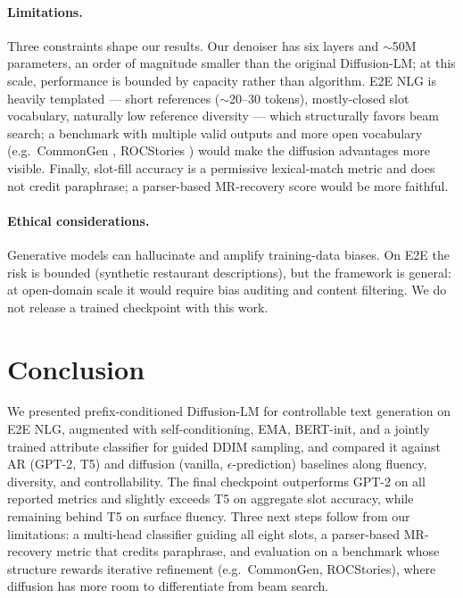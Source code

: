 \documentclass{llncs}
\begin{document}
\paragraph{Limitations.}
Three constraints shape our results. Our denoiser has six layers and
$\sim$50M parameters, an order of magnitude smaller than the original
Diffusion-LM; at this scale, performance is bounded by capacity rather
than algorithm. E2E NLG is heavily templated --- short references
($\sim$20--30 tokens), mostly-closed slot vocabulary, naturally low
reference diversity --- which structurally favors beam search; a benchmark
with multiple valid outputs and more open vocabulary (e.g.\ CommonGen
\cite{lin2020commongen}, ROCStories \cite{mostafazadeh2016rocstories})
would make the diffusion advantages more visible. Finally, slot-fill
accuracy is a permissive lexical-match metric and does not credit
paraphrase; a parser-based MR-recovery score would be more faithful.

\paragraph{Ethical considerations.}
Generative models can hallucinate and amplify training-data biases. On E2E
the risk is bounded (synthetic restaurant descriptions), but the framework is
general: at open-domain scale it would require bias auditing and content
filtering. We do not release a trained checkpoint with this work.

\section{Conclusion}
\label{sec:conclusion}

We presented prefix-conditioned Diffusion-LM for controllable text
generation on E2E NLG, augmented with self-conditioning, EMA, BERT-init, and
a jointly trained attribute classifier for guided DDIM sampling, and compared
it against AR (GPT-2, T5) and diffusion (vanilla, $\epsilon$-prediction)
baselines along fluency, diversity, and controllability. The final checkpoint
outperforms GPT-2 on all reported metrics and slightly exceeds T5 on
aggregate slot accuracy, while remaining behind T5 on surface fluency.
Three next steps follow from our limitations: a multi-head classifier
guiding all eight slots, a parser-based MR-recovery metric that credits
paraphrase, and evaluation on a benchmark whose structure rewards iterative
refinement (e.g.\ CommonGen, ROCStories), where diffusion has more room to
differentiate from beam search.



\end{document}
